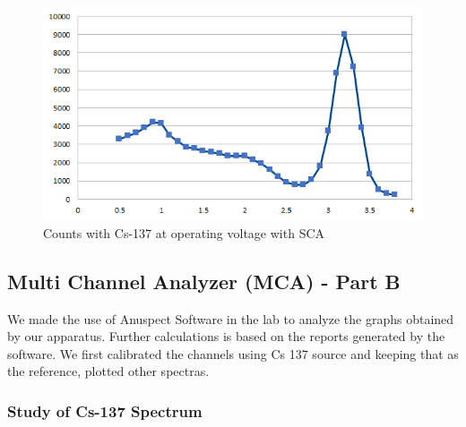 \documentclass[%
 reprint,
nofootinbib,
 amsmath,amssymb,
 aps,
floatfix,
]{revtex4-2}
\begin{document}
\begin{figure}
    \centering
    \includegraphics[scale = 0.7]{Figures/sca-cs-137.png}
    \caption{Counts with Cs-137 at operating voltage with SCA}
    \label{fig:my_label}
\end{figure}
\subsection{Multi Channel Analyzer (MCA) - Part B}
We made the use of Anuspect Software in the lab to analyze the graphs obtained by our apparatus. Further calculations is based on the reports generated by the software.
We first calibrated the channels using Cs 137 source and keeping that as the reference, plotted other spectras. 
\newpage
\subsubsection*{Study of Cs-137 Spectrum}
\end{document}
